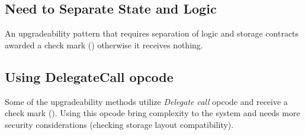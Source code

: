 
\subsection{Need to Separate State and Logic}

An upgradeability pattern that requires separation of logic and storage contracts awarded a check mark (\checkmark) otherwise it receives nothing.

\subsection{Using DelegateCall opcode}

Some of the upgradeability methods utilize \textit{Delegate call} opcode and receive a check mark (\checkmark). Using  this opcode bring complexity to the system and needs more security considerations (\eg checking storage layout compatibility). 
 
